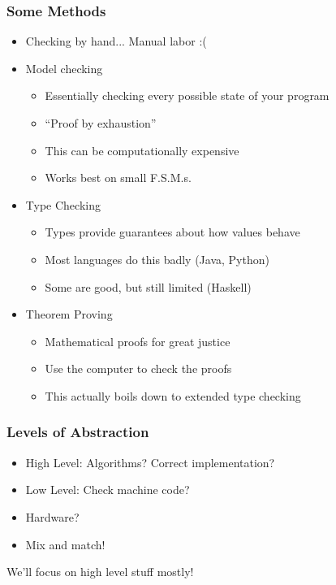 \documentclass{beamer}
\begin{document}
\begin{frame}
  \frametitle{Some Methods}

  \begin{itemize}
  \item<1-> Checking by hand... Manual labor :(
  \item<2-> Model checking
    \begin{itemize}
    \item Essentially checking every possible state of your program
    \item ``Proof by exhaustion''
    \item This can be computationally expensive
    \item Works best on small F.S.M.s.
    \end{itemize}
  \item<3-> Type Checking
    \begin{itemize}
    \item Types provide guarantees about how values behave
    \item Most languages do this badly (Java, Python)
    \item Some are good, but still limited (Haskell)
    \end{itemize}
  \item<4-> Theorem Proving
    \begin{itemize}
    \item Mathematical proofs for great justice
    \item Use the computer to check the proofs
    \item This actually boils down to extended type checking
    \end{itemize}
  \end{itemize}
\end{frame}

\begin{frame}
  \frametitle{Levels of Abstraction}

  \begin{itemize}
  \item<1-> High Level: Algorithms? Correct implementation?
  \item<2-> Low Level: Check machine code?
  \item<3-> Hardware?
  \item<4-> Mix and match!
  \end{itemize}


  We'll focus on high level stuff mostly!
\end{frame}
\end{document}
